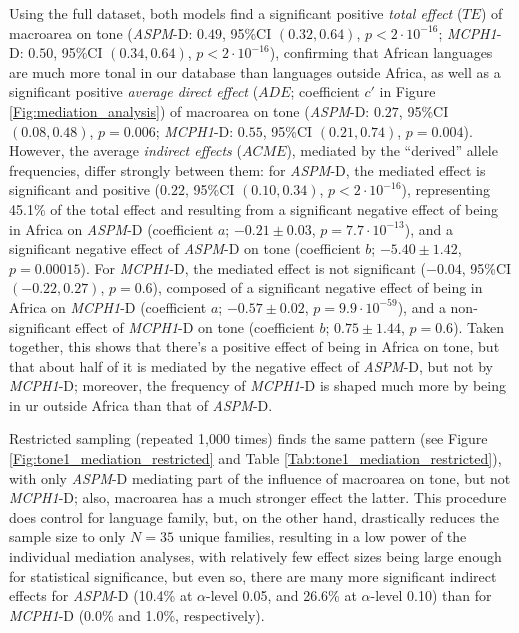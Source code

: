 \documentclass[twoside,onecolumn]{article}
\begin{document}
Using the full dataset, both models find a significant positive \textit{total effect} ($TE$) of macroarea on tone (\textit{ASPM}-D: $0.49$, 95\%CI $(0.32, 0.64)$, $p < 2\cdot10^{-16}$; \textit{MCPH1}-D:  $0.50$, 95\%CI $(0.34, 0.64)$, $p < 2\cdot10^{-16}$), confirming that African languages are much more tonal in our database than languages outside Africa, as well as a significant positive \textit{average direct effect} ($ADE$; coefficient $c'$ in Figure \ref{Fig:mediation_analysis}) of macroarea on tone (\textit{ASPM}-D: $0.27$, 95\%CI $(0.08, 0.48)$, $p = 0.006$; \textit{MCPH1}-D:  $0.55$, 95\%CI $(0.21, 0.74)$, $p = 0.004$).
However, the average \textit{indirect effects} ($ACME$), mediated by the ``derived'' allele frequencies, differ strongly between them: for \textit{ASPM}-D, the mediated effect is significant and positive ($0.22$, 95\%CI $(0.10, 0.34)$, $p < 2\cdot10^{-16}$), representing 45.1\% of the total effect and resulting from a significant negative effect of being in Africa on \textit{ASPM}-D (coefficient $a$; $-0.21 \pm0.03$, $p = 7.7\cdot10^{-13}$), and a significant negative effect of \textit{ASPM}-D on tone (coefficient $b$; $-5.40 \pm1.42$, $p = 0.00015$).
For \textit{MCPH1}-D, the mediated effect is not significant ($-0.04$, 95\%CI $(-0.22, 0.27)$, $p = 0.6$), composed of a significant negative effect of being in Africa on \textit{MCPH1}-D (coefficient $a$; $-0.57 \pm0.02$, $p = 9.9\cdot10^{-59}$), and a non-significant effect of \textit{MCPH1}-D on tone (coefficient $b$; $0.75 \pm1.44$, $p = 0.6$).
Taken together, this shows that there's a positive effect of being in Africa on tone, but that about half of it is mediated by the negative effect of \textit{ASPM}-D, but not by \textit{MCPH1}-D; moreover, the frequency of \textit{MCPH1}-D is shaped much more by being in ur outside Africa than that of \textit{ASPM}-D.

Restricted sampling (repeated 1,000 times) finds the same pattern (see Figure \ref{Fig:tone1_mediation_restricted} and Table \ref{Tab:tone1_mediation_restricted}), with only \textit{ASPM}-D mediating part of the influence of macroarea on tone, but not \textit{MCPH1}-D; also, macroarea has a much stronger effect the latter.
This procedure does control for language family, but, on the other hand, drastically reduces the sample size to only $N=35$ unique families, resulting in a low power of the individual mediation analyses, with relatively few effect sizes being large enough for statistical significance, but even so, there are many more significant indirect effects for \textit{ASPM}-D (10.4\% at $\alpha$-level 0.05, and 26.6\% at $\alpha$-level 0.10) than for \textit{MCPH1}-D (0.0\% and 1.0\%, respectively).
\end{document}
